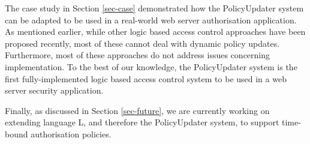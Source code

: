 \documentclass[glov2,twocolumn,final]{svjour2}
\begin{document}
    The case study in Section \ref{sec-case} demonstrated how the PolicyUpdater
    system can be adapted to be used in a real-world web server authorisation
    application. As mentioned earlier, while other logic based access control
    approaches have been proposed recently, most of these cannot deal with
    dynamic policy updates. Furthermore, most of these approaches do not
    address issues concerning implementation. To the best of our knowledge, the
    PolicyUpdater system is the first fully-implemented logic
    based access control system to be used in a web server security
    application.

    Finally, as discussed in Section \ref{sec-future}, we are currently working
    on extending language {\cal L}, and therefore the PolicyUpdater system, to
    support time-bound authorisation policies.
\end{document}
